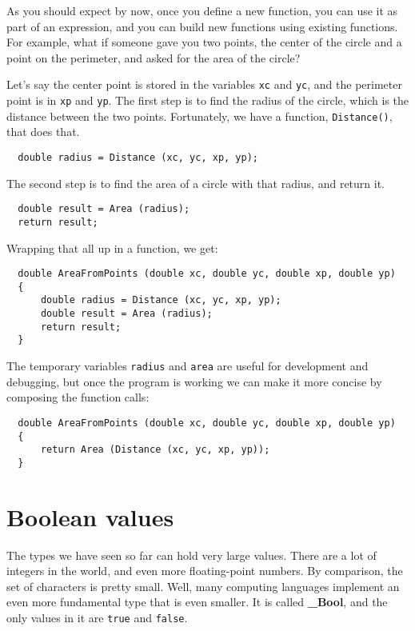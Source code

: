As you should expect by now, once you define a new function,
you can use it as part of an expression, and you can build
new functions using existing functions.  For example, what if someone
gave you two points, the center of the circle and a point on
the perimeter, and asked for the area of the circle?

Let's say the center point is stored in the variables {\tt xc}
and {\tt yc}, and the perimeter point is in {\tt xp} and
{\tt yp}.  The first step is to find the radius of the circle, which
is the distance between the two points.  Fortunately, we have
a function, {\tt Distance()}, that does that.

\begin{verbatim}
  double radius = Distance (xc, yc, xp, yp);
\end{verbatim}
%
The second step is to find the area of a circle with that
radius, and return it.

\begin{verbatim}
  double result = Area (radius);
  return result;
\end{verbatim}
%
Wrapping that all up in a function, we get:

\begin{verbatim}
  double AreaFromPoints (double xc, double yc, double xp, double yp) 
  {
      double radius = Distance (xc, yc, xp, yp);
      double result = Area (radius);
      return result;
  } 
\end{verbatim}
%


The temporary variables {\tt radius} and {\tt area} are
useful for development and debugging, but once the program is
working we can make it more concise by composing
the function calls:

\begin{verbatim}
  double AreaFromPoints (double xc, double yc, double xp, double yp) 
  {
      return Area (Distance (xc, yc, xp, yp));
  } 
\end{verbatim}


\section{Boolean values}

The types we have seen so far can hold very large values.  There are a lot
of integers in the world, and even more floating-point numbers.
By comparison, the set of characters is pretty small.  Well, many computing
languages implement an even more fundamental type that is even smaller.  It is called
{\bf \_Bool}, and the only values in it are {\tt true} and {\tt false}.

